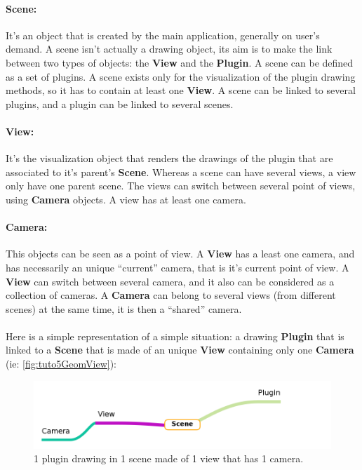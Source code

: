 \documentclass[a4paper]{scrreprt}
\begin{document}
	\paragraph{Scene:}
	It's an object that is created by the main application, generally on user's
	demand. A scene isn't actually a drawing object, its aim is to make the link
	between two types of objects: the \textbf{View} and the \textbf{Plugin}. A
	scene can be defined as a set of plugins. A scene exists only for the
	visualization of the plugin drawing methods, so it has to contain at least one
	\textbf{View}. A scene can be linked to several plugins, and a plugin can be
	linked to several scenes.
	\paragraph{View:}
	It's the visualization object that renders the drawings of the plugin that are
	associated to it's parent's \textbf{Scene}. Whereas a scene can have several
	views, a view only have one parent scene. The views can switch between several
	point of views, using \textbf{Camera} objects. A view has at least one camera.
	\paragraph{Camera:}
	This objects can be seen as a point of view. A \textbf{View} has a least one
	camera, and has necessarily an unique ``current'' camera, that is it's current
	point of view. A \textbf{View} can switch between several camera, and it also
	can be considered as a collection of cameras. A \textbf{Camera} can belong to
	several views (from different scenes) at the same time, it is then a ``shared''
	camera.
	\FloatBarrier
	\paragraph{}
	Here is a simple representation of a simple situation: a drawing
	\textbf{Plugin} that is linked to a \textbf{Scene} that is made of an unique
	\textbf{View} containing only one \textbf{Camera} (ie:
	\ref{fig:tuto5GeomView}):
	\begin{figure}[h!p]
		\centering
		\includegraphics[width=1\textwidth]{images/systemMap1}
		\caption{1 plugin drawing in 1 scene made of 1 view that has 1 camera.}		
	\end{figure}
\end{document}
